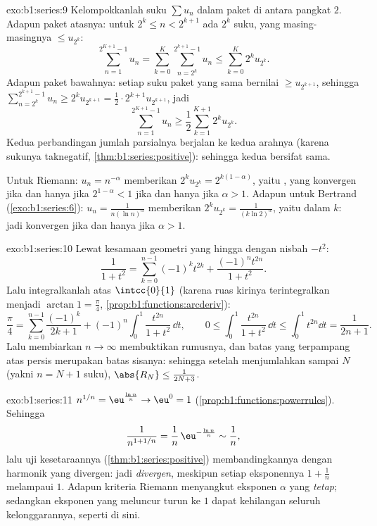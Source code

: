 \begin{solution}{exo:b1:series:9}
Kelompokkanlah suku $\sum u_n$ dalam paket di antara pangkat $2$.
Adapun paket atasnya: untuk $2^k \leq n < 2^{k+1}$ ada $2^k$ suku,
yang masing-masingnya $\leq u_{2^k}$:
\[
\sum_{n=1}^{2^{K+1}-1} u_n
= \sum_{k=0}^{K} \sum_{n=2^k}^{2^{k+1}-1} u_n
\leq \sum_{k=0}^{K} 2^k u_{2^k} .
\]
Adapun paket bawahnya: setiap suku paket yang sama bernilai $\geq u_{2^{k+1}}$,
sehingga $\sum_{n=2^k}^{2^{k+1}-1} u_n \geq 2^k u_{2^{k+1}} = \frac12
\cdot 2^{k+1} u_{2^{k+1}}$, jadi
\[
\sum_{n=1}^{2^{K+1}-1} u_n \geq \frac12 \sum_{k=1}^{K+1} 2^{k}
u_{2^{k}} .
\]
Kedua perbandingan jumlah parsialnya berjalan ke kedua arahnya (karena sukunya taknegatif,
\cref{thm:b1:series:positive}): sehingga kedua  bersifat sama.

Untuk Riemann: $u_n = n^{-\alpha}$ memberikan $2^k u_{2^k} =
2^{k(1-\alpha)}$, yaitu , yang konvergen jika dan hanya jika $2^{1 - \alpha}
< 1$ jika dan hanya jika $\alpha > 1$. Adapun untuk Bertrand
(\cref{exo:b1:series:6}): $u_n = \frac{1}{n(\ln n)^\alpha}$ memberikan
$2^k u_{2^k} = \frac{1}{(k\ln 2)^\alpha}$, yaitu  dalam $k$:
jadi konvergen jika dan hanya jika $\alpha > 1$.
\end{solution}

\begin{solution}{exo:b1:series:10}
Lewat kesamaan geometri yang hingga dengan nisbah $-t^2$:
\[
\frac{1}{1 + t^2} = \sum_{k=0}^{n-1} (-1)^k t^{2k}
+ \frac{(-1)^n t^{2n}}{1 + t^2} .
\]
Lalu integralkanlah atas $\intcc{0}{1}$ (karena ruas kirinya terintegralkan menjadi $\arctan
1 = \frac\pi4$, \cref{prop:b1:functions:arcderiv}):
\[
\frac{\pi}{4} = \sum_{k=0}^{n-1} \frac{(-1)^k}{2k+1}
+ (-1)^n \int_0^1 \frac{t^{2n}}{1+t^2}\,\dd t,
\qquad
0 \leq \int_0^1 \frac{t^{2n}}{1+t^2}\,\dd t \leq \int_0^1 t^{2n}\dd
t = \frac{1}{2n+1} .
\]
Lalu membiarkan $n \to \infty$ membuktikan rumusnya, dan batas yang terpampang
atas  persis merupakan batas sisanya: sehingga setelah menjumlahkan sampai
$N$ (yakni $n = N + 1$ suku), $\abs{R_N} \leq \frac{1}{2N + 3}$.
\end{solution}

\begin{solution}{exo:b1:series:11}
$n^{1/n} = \eu^{\frac{\ln n}{n}} \to \eu^0 = 1$
(\cref{prop:b1:functions:powerrules}). Sehingga
\[
\frac{1}{n^{1 + 1/n}} = \frac{1}{n}\,\eu^{-\frac{\ln n}{n}}
\sim \frac{1}{n} ,
\]
lalu uji kesetaraannya (\cref{thm:b1:series:positive})
membandingkannya dengan  harmonik yang divergen: jadi \emph{divergen},
meskipun setiap eksponennya $1 + \frac1n$ melampaui $1$. Adapun kriteria
Riemann menyangkut eksponen $\alpha$ yang \emph{tetap}; sedangkan eksponen
yang meluncur turun ke $1$ dapat kehilangan seluruh kelonggarannya, seperti di sini.
\end{solution}

